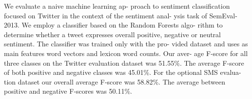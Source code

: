 We evaluate a naive machine learning ap- proach to sentiment classification focused on
 Twitter in the context of the sentiment anal-
 ysis task of SemEval-2013. We employ a
 classifier based on the Random Forests algo-
 rithm to determine whether a tweet expresses
 overall positive, negative or neutral sentiment.
 The classifier was trained only with the pro-
 vided dataset and uses as main features word
 vectors and lexicon word counts. Our aver-
 age F-score for all three classes on the Twitter
 evaluation dataset was 51.55\%. The average
 F-score of both positive and negative classes
 was 45.01\%. For the optional SMS evalua-
 tion dataset our overall average F-score was
 58.82\%. The average between positive and
 negative F-scores was 50.11\%.


